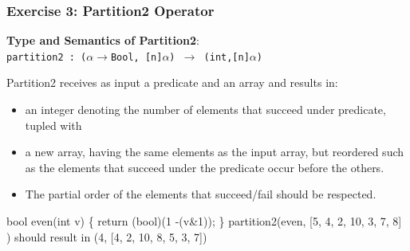 \documentclass{beamer}
\renewcommand{\emph}[1]{\textcolor{CosGreen}{ #1}}
\begin{document}
\begin{frame}[fragile,t]
  \frametitle{Exercise 3: Partition2 Operator}

{\bf Type and Semantics of Partition2}:\\
\emph{\tt partition2 : ($\alpha\rightarrow$Bool, [n]$\alpha$) $\rightarrow$ (int,[n]$\alpha$)}\\\bigskip

Partition2 receives as input a predicate and an array and results in:
\begin{itemize}
    \item an integer denoting the number of elements that succeed under predicate, tupled with
    \item a new array, having the same elements as the input array, but reordered
            such as the elements that succeed under the predicate occur before the others.
    \item The partial order of the elements that succeed/fail should be respected.
\end{itemize}\bigskip

\begin{colorcode}
bool even(int v) \{ return (bool)(1 -(v&1)); \}
partition2(even, [5, 4, 2, 10, 3, 7, 8] ) should result in
             (4, [4, 2, 10, 8, 5, 3, 7])
\end{colorcode}

\end{frame}
\end{document}
